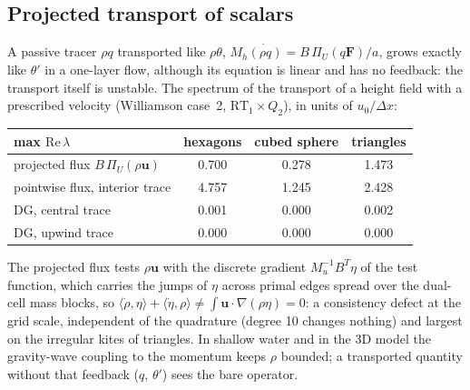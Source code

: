 \documentclass[preprint,12pt]{elsarticle}
\newcommand{\bu}{\mathbf{u}}
\newcommand{\bF}{\mathbf{F}}
\theoremstyle{definition}
\begin{document}
\subsection{Projected transport of scalars}\label{sec:projected}
A passive tracer $\rho q$ transported like $\rho\theta$, $M_h\dot{(\rho q)} = B\,\Pi_U(q\bF)/a$, grows exactly
like $\theta'$ in a one-layer flow, although its equation is linear and has no feedback: the transport itself
is unstable. The spectrum of the transport of a height field with a prescribed velocity (Williamson case~2,
$\mathrm{RT}_1\times Q_2$), in units of $u_0/\Delta x$:
\begin{center}
\begin{tabular}{lccc}
\toprule
max $\mathrm{Re}\,\lambda$ & hexagons & cubed sphere & triangles \\
\midrule
projected flux $B\,\Pi_U(\rho\bu)$ & 0.700 & 0.278 & 1.473 \\
pointwise flux, interior trace & 4.757 & 1.245 & 2.428 \\
DG, central trace & 0.001 & 0.000 & 0.002 \\
DG, upwind trace & 0.000 & 0.000 & 0.000 \\
\bottomrule
\end{tabular}
\end{center}
The projected flux tests $\rho\bu$ with the discrete gradient $M_u^{-1}B^T\eta$ of the test function, which
carries the jumps of $\eta$ across primal edges spread over the dual-cell mass blocks, so
$\langle\dot\rho,\eta\rangle + \langle\dot\eta,\rho\rangle\ne\int\bu\cdot\nabla(\rho\eta) = 0$: a consistency
defect at the grid scale, independent of the quadrature (degree 10 changes nothing) and largest on the
irregular kites of triangles. In shallow water and in the 3D model the gravity-wave coupling to the momentum
keeps $\rho$ bounded; a transported quantity without that feedback ($q$, $\theta'$) sees the bare operator.
\end{document}
